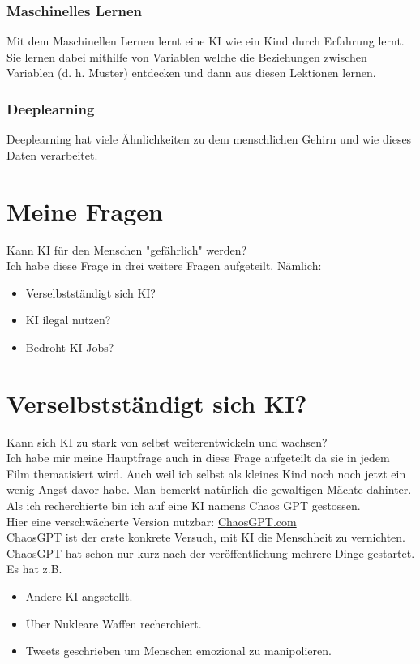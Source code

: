\subsubsection{Maschinelles Lernen}

Mit dem Maschinellen Lernen lernt eine KI wie ein Kind durch Erfahrung lernt. Sie lernen dabei mithilfe von Variablen welche die Beziehungen zwischen Variablen (d. h. Muster) entdecken und dann aus diesen Lektionen lernen.

\subsubsection{Deeplearning}

Deeplearning hat viele Ähnlichkeiten zu dem menschlichen Gehirn und wie dieses Daten verarbeitet.



\section{Meine Fragen}
Kann KI für den Menschen "gefährlich" werden?
\\
Ich habe diese Frage in drei weitere Fragen aufgeteilt.
\newline Nämlich: 
\begin{itemize}
    \item Verselbstständigt sich KI?
    \item KI ilegal nutzen?
    \item Bedroht KI Jobs?
\end{itemize}


\newpage
\section{Verselbstständigt sich KI?}
Kann sich KI zu stark von selbst weiterentwickeln und wachsen?
\\
Ich habe mir meine Hauptfrage auch in diese Frage aufgeteilt da sie in jedem Film thematisiert wird. 
Auch weil ich selbst als kleines Kind noch noch jetzt ein wenig Angst davor habe. 
Man bemerkt natürlich die gewaltigen Mächte dahinter. Als ich recherchierte bin ich auf eine KI namens Chaos GPT gestossen.
\\
Hier eine verschwächerte Version nutzbar: \href{https://flowgpt.com/p/chaosgpt}{ChaosGPT.com}
\\
ChaosGPT ist der erste konkrete Versuch, mit KI die Menschheit zu vernichten. \citep{the-decoder}
ChaosGPT hat schon nur kurz nach der veröffentlichung mehrere Dinge gestartet. Es hat z.B.
\begin{itemize}
    \item Andere KI angsetellt.
    \item Über Nukleare Waffen recherchiert.
    \item Tweets geschrieben um Menschen emozional zu manipolieren.
\end{itemize}

